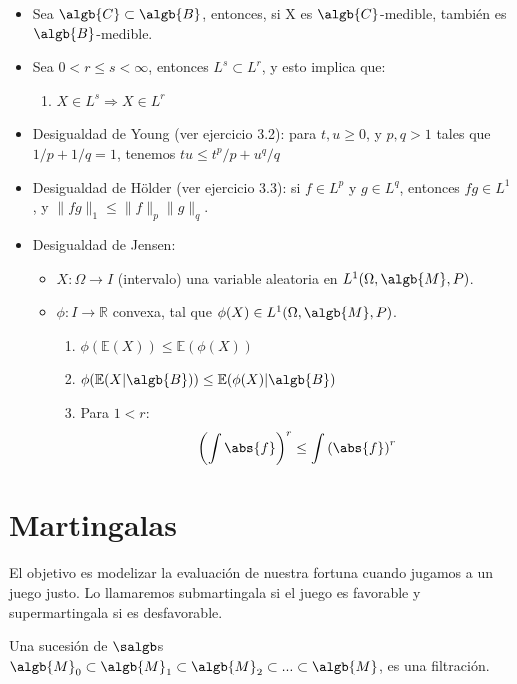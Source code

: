 \documentclass{apuntes}
\begin{document}
\begin{itemize}
\item Sea $\algb{C} \subset \algb{B}$, entonces, si X es $\algb{C}$-medible, también es $\algb{B}$-medible.

\item Sea $0<r\leq s<\infty$, entonces $L^s \subset L^r$, y esto implica que:
\begin{enumerate}
\item  $X \in L^s \Rightarrow X \in L^r$
\end{enumerate}

\item Desigualdad de Young (ver ejercicio 3.2): para $t, u \ge 0$, y $p,q > 1$ tales que $1/p + 1/q =1$, tenemos $tu \le t^p/ p + u^q/ q$
\item Desigualdad de Hölder (ver ejercicio 3.3): si $f\in L^p$ y $g\in L^q$, entonces $fg\in L^1$, y $\|fg\|_1 \le \|f\|_p\|g\|_q$.
\item Desigualdad de Jensen:
\begin{itemize}
\item $X: \Omega \rightarrow I$ (intervalo) una variable aleatoria en $L^1(\Omega, \algb{M},P)$.
\item $\phi: I \rightarrow \mathbb{R}$ convexa, tal que $\phi(X) \in L^1(\Omega,\algb{M},P)$.
\begin{enumerate}
\item $\phi(\mathbb{E}(X)) \leq \mathbb{E}(\phi(X))$
\item $\phi(\mathbb{E}(X|\algb{B})) \leq \mathbb{E}(\phi(X)|\algb{B})$
\item Para $1<r$:
$$\left(\int \abs{f}\right)^r \leq\int \left( \abs{f} \right)^r$$
\end{enumerate}
\end{itemize}

\end{itemize}




\chapter{Martingalas}
El objetivo es modelizar la evaluación de nuestra fortuna cuando jugamos a un juego justo. Lo llamaremos submartingala si el juego es favorable y supermartingala si es desfavorable.

\begin{defn}[Filtración]
Una sucesión de $\salgb$s $\algb{M}_0 \subset \algb{M}_1 \subset \algb{M}_2 \subset ... \subset \algb{M}$, es una filtración.
\end{defn}
\end{document}
